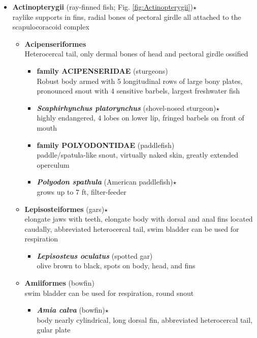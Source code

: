 \documentclass[a4paper,12pt]{article}
\begin{document}
\begin{description}
\begin{itemize}
  \begin{itemize}
    \item{\textbf{Actinopterygii} (ray-finned fish; Fig. \ref{fig:Actinopterygii})}$\star$\\ raylike supports in fins, radial bones of pectoral girdle all attached to the scapulocoracoid complex
    \begin{itemize}
      \item{\textbf{Acipenseriformes}} \\ Heterocercal tail, only dermal bones of head and pectoral girdle ossified
      \begin{itemize}
        \item{\textbf{family ACIPENSERIDAE} (sturgeons)} \\ Robust body armed with 5 longitudinal rows of large bony plates, pronounced snout with 4 sensitive barbels, largest freshwater fish
          \item{\textbf{\textit{   Scaphirhynchus platorynchus}} (shovel-nosed sturgeon)$\star$} \\ highly endangered, 4 lobes on lower lip, fringed barbels on front of mouth
        \item{\textbf{family POLYODONTIDAE} (paddlefish)} \\ paddle/spatula-like snout, virtually naked skin, greatly extended operculum
          \item{\textbf{\textit{   Polyodon spathula}} (American paddlefish)$\star$} \\ grows up to 7 ft, filter-feeder
      \end{itemize}
      \item{\textbf{Lepisosteiformes} (gars)$\star$} \\ elongate jaws with teeth, elongate body with dorsal and anal fins located caudally, abbreviated heterocercal tail, swim bladder can be used for respiration
      \begin{itemize}
        \item{\textbf{\textit{   Lepisosteus oculatus}} (spotted gar)} \\ olive brown to black, spots on body, head, and fins
      \end{itemize}
      \item{\textbf{Amiiformes} (bowfin)} \\ swim bladder can be used for respiration, round snout
      \begin{itemize}
        \item{\textbf{\textit{   Amia calva}} (bowfin)$\star$} \\ body nearly cylindrical, long dorsal fin, abbreviated heterocercal tail, gular plate

\end{itemize}
\end{itemize}
\end{itemize}
\end{itemize}
\end{description}
\end{document}

